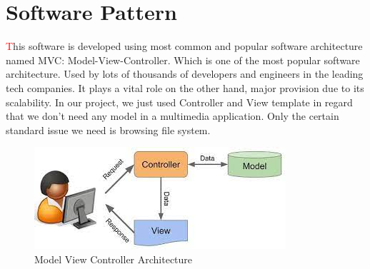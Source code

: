 \documentclass{report}
\begin{document}
\section{Software Pattern}
\begin{justify}
  {\large
  \hspace*{0.5cm} \textcolor{red}{\large T}his software is developed using most common and popular software architecture named MVC: Model-View-Controller.
  Which is one of the most popular software architecture.
  Used by lots of thousands of developers and engineers in the leading tech companies.
  It plays a vital role on the other hand, major provision due to its scalability.
  In our project, we just used Controller and View template in regard that we don't need any model in a multimedia application.
  Only the certain standard issue we need is browsing file system.
  }
\end{justify}
\vspace*{1cm}
\begin{figure}[!h]
  \centering
  \caption[MVC]{Model View Controller Architecture}
  \vspace*{0.6cm}
  \includegraphics[scale=0.6]{img/mvc.jpg}
\end{figure}

\pagebreak
\end{document}
